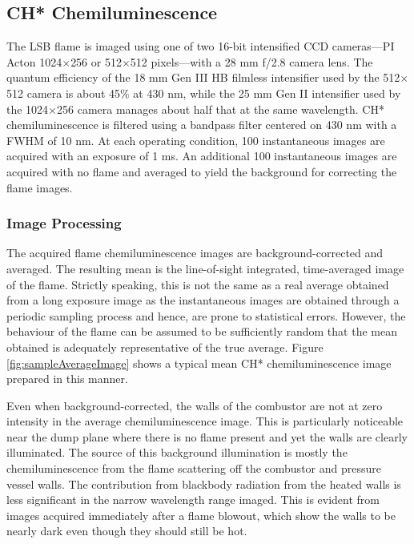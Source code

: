 \subsection{CH* Chemiluminescence}
\label{subsec:experimental-ch-chemiluminescence}

The LSB flame is imaged using one of two 16-bit intensified CCD cameras---PI Acton 1024\(\times\)256 or 512\(\times\)512 pixels---with a 28 mm f/2.8 camera lens.
The quantum efficiency of the 18 mm Gen III HB filmless intensifier used by the 512\(\times\)512 camera is about 45\% at 430 nm, while the 25 mm Gen II intensifier used by the 1024\(\times\)256 camera manages about half that at the same wavelength.
CH* chemiluminescence is filtered using a bandpass filter centered on 430 nm with a FWHM of 10 nm.
At each operating condition, 100 instantaneous images are acquired with an exposure of 1 ms.
An additional 100 instantaneous images are acquired with no flame and averaged to yield the background for correcting the flame images.

\subsubsection{Image Processing}
\label{subsubsec:chemiluminescence-image-processing}



The acquired flame chemiluminescence images are background-corrected and averaged.
The resulting mean is the line-of-sight integrated, time-averaged image of the flame.
Strictly speaking, this is not the same as a real average obtained from a long exposure image as the instantaneous images are obtained through a periodic sampling process and hence, are prone to statistical errors.
However, the behaviour of the flame can be assumed to be sufficiently random that the mean obtained is adequately representative of the true average.
Figure \ref{fig:sampleAverageImage} shows a typical mean CH* chemiluminescence image prepared in this manner.

Even when background-corrected, the walls of the combustor are not at zero intensity in the average chemiluminescence image.
This is particularly noticeable near the dump plane where there is no flame present and yet the walls are clearly illuminated.
The source of this background illumination is mostly the chemiluminescence from the flame scattering off the combustor and pressure vessel walls.
The contribution from blackbody radiation from the heated walls is less significant in the narrow wavelength range imaged.
This is evident from images acquired immediately after a flame blowout, which show the walls to be nearly dark even though they should still be hot.

